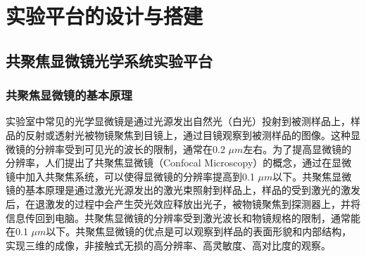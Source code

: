 \documentclass[type = bachelor, oneside]{whu-thesis}
\begin{document}

\chapter{实验平台的设计与搭建}

\section{共聚焦显微镜光学系统实验平台}
\subsection{共聚焦显微镜的基本原理}
实验室中常见的光学显微镜是通过光源发出自然光（白光）投射到被测样品上，样品的反射或透射光被物镜聚焦到目镜上，通过目镜观察到被测样品的图像。这种显微镜的分辨率受到可见光的波长的限制，通常在0.2 $\mu m$左右。为了提高显微镜的分辨率，人们提出了共聚焦显微镜（Confocal Microscopy）的概念，通过在显微镜中加入共聚焦系统，可以使得显微镜的分辨率提高到0.1 $\mu m$以下。共聚焦显微镜的基本原理是通过激光光源发出的激光束照射到样品上，样品的受到激光的激发后，在退激发的过程中会产生荧光效应释放出光子，被物镜聚焦到探测器上，并将信息传回到电脑。共聚焦显微镜的分辨率受到激光波长和物镜规格的限制，通常能在0.1 $\mu m$以下。共聚焦显微镜的优点是可以观察到样品的表面形貌和内部结构，实现三维的成像，非接触式无损的高分辨率、高灵敏度、高对比度的观察。
\end{document}
